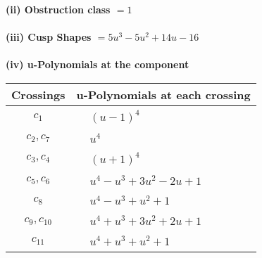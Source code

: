 \documentclass[1p]{elsarticle_modified}
\theoremstyle{definition}
\begin{document}
\flushleft \textbf{(ii) Obstruction class $= 1$}\\~\\
\flushleft \textbf{(iii) Cusp Shapes $= 5 u^3-5 u^2+14 u-16$}\\~\\
\newpage\renewcommand{\arraystretch}{1}
\flushleft \textbf{(iv) u-Polynomials at the component}\newline \\
\begin{tabular}{m{50pt}|m{274pt}}
Crossings & \hspace{64pt}u-Polynomials at each crossing \\
\hline $$\begin{aligned}c_{1}\end{aligned}$$&$\begin{aligned}
&(u-1)^4
\end{aligned}$\\
\hline $$\begin{aligned}c_{2},c_{7}\end{aligned}$$&$\begin{aligned}
&u^4
\end{aligned}$\\
\hline $$\begin{aligned}c_{3},c_{4}\end{aligned}$$&$\begin{aligned}
&(u+1)^4
\end{aligned}$\\
\hline $$\begin{aligned}c_{5},c_{6}\end{aligned}$$&$\begin{aligned}
&u^4- u^3+3 u^2-2 u+1
\end{aligned}$\\
\hline $$\begin{aligned}c_{8}\end{aligned}$$&$\begin{aligned}
&u^4- u^3+u^2+1
\end{aligned}$\\
\hline $$\begin{aligned}c_{9},c_{10}\end{aligned}$$&$\begin{aligned}
&u^4+u^3+3 u^2+2 u+1
\end{aligned}$\\
\hline $$\begin{aligned}c_{11}\end{aligned}$$&$\begin{aligned}
&u^4+u^3+u^2+1
\end{aligned}$\\
\hline
\end{tabular}\\~\\
\end{document}
